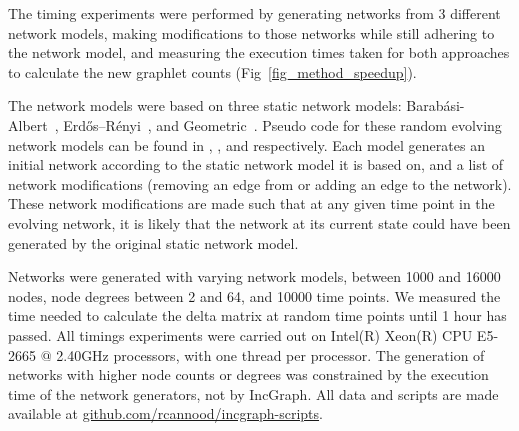 The timing experiments were performed by generating networks from 3 different network models, making modifications to those networks while still adhering to the network model, and measuring the execution times taken for both approaches to calculate the new graphlet counts (Fig~\ref{fig_method_speedup}). 



The network models were based on three static network models: Barab\'asi-Albert~\cite{Albert2002}, Erd\H{o}s--R\'enyi~\cite{Erdos1959}, and Geometric~\cite{Appel1997}. Pseudo code for these random evolving network models can be found in , , and  respectively.
Each model generates an initial network according to the static network model it is based on, and a list of network modifications (removing an edge from or adding an edge to the network). These network modifications are made such that at any given time point in the evolving network, it is likely that the network at its current state could have been generated by the original static network model.

Networks were generated with varying network models, between 1000 and 16000 nodes, node degrees between 2 and 64, and 10000 time points. We measured the time needed to calculate the delta matrix at random time points until 1 hour has passed. All timings experiments were carried out on Intel(R) Xeon(R) CPU E5-2665 $@$ 2.40GHz processors, with one thread per processor.
The generation of networks with higher node counts or degrees was constrained by the execution time of the network generators, not by IncGraph. All data and scripts are made available at \href{https://github.com/rcannood/incgraph-scripts}{github.com/rcannood/incgraph-scripts}.

